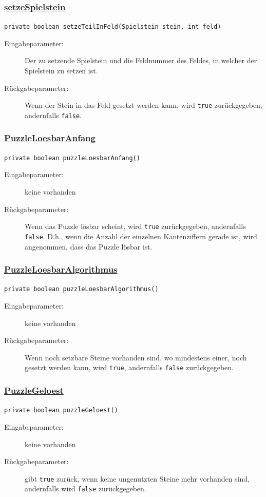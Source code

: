 \subsubsection{\underline{setzeSpielstein}}
\lstinline{private boolean setzeTeilInFeld(Spielstein stein, int feld)}
\begin{description}
	\item [Eingabeparameter:] Der zu setzende Spielstein und die Feldnummer des Feldes, in welcher der Spielstein zu setzen ist.
	\item [Rückgabeparameter:] Wenn der Stein in das Feld gesetzt werden kann, wird \lstinline{true} zurückgegeben, andernfalls \lstinline{false}.
\end{description}

\subsubsection{\underline{PuzzleLoesbarAnfang}}
\lstinline{private boolean puzzleLoesbarAnfang()}
\begin{description}
	\item [Eingabeparameter:] keine vorhanden
	\item [Rückgabeparameter:] Wenn das Puzzle lösbar scheint, wird \lstinline{true} zurückgegeben, andernfalls \lstinline{false}. D.h., wenn die Anzahl der einzelnen Kantenziffern gerade ist, wird angenommen, dass das Puzzle lösbar ist.
\end{description}

\subsubsection{\underline{PuzzleLoesbarAlgorithmus}}
\lstinline{private boolean puzzleLoesbarAlgorithmus()}
\begin{description}
	\item [Eingabeparameter:] keine vorhanden
	\item [Rückgabeparameter:] Wenn noch setzbare Steine vorhanden sind, wo mindestens einer, noch gesetzt werden kann, wird \lstinline{true}, andernfalls \lstinline{false} zurückgegeben.
\end{description}

\subsubsection{\underline{PuzzleGeloest}}
\lstinline{private boolean puzzleGeloest()}
\begin{description}
	\item [Eingabeparameter:] keine vorhanden
	\item [Rückgabeparameter:] gibt \lstinline{true} zurück, wenn keine ungenutzten Steine mehr vorhanden sind, andernfalls wird \lstinline{false} zurückgegeben.
\end{description}

